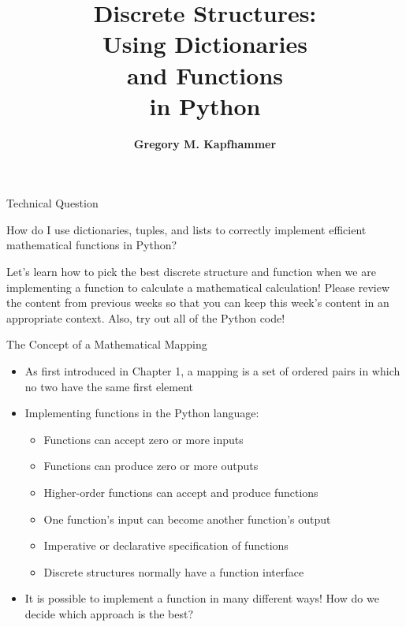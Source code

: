 \documentclass[14pt,aspectratio=169]{beamer}
\title{Discrete Structures: \\ Using Dictionaries \\ and Functions \\ in Python}
\author{{\bf Gregory M. Kapfhammer}}
\institute[shortinst]{{\bf Department of Computer Science, Allegheny College}}
\begin{document}
{
  \begin{frame}
    \titlepage
  \end{frame}
}

%
\begin{frame}{Technical Question}
  \hspace*{.5in}
  \begin{minipage}{4.3in}
    \vspace*{.1in}
    \begin{center}
      {\large How do I use dictionaries, tuples, and lists to correctly
      implement efficient mathematical functions in Python?}
    \end{center}
  \end{minipage}
  \vspace{2ex}
  \begin{center}
    \small Let's learn how to pick the best discrete structure and function when
    we are implementing a function to calculate a mathematical calculation!
    Please review the content from previous weeks so that you can keep this
    week's content in an appropriate context. Also, try out all of the Python
    code!
  \end{center}
\end{frame}

%
\begin{frame}{The Concept of a Mathematical Mapping}
  \begin{itemize}
    \item As first introduced in Chapter 1, a mapping is a set of ordered pairs
      in which no two have the same first element
      \vspace*{-.15in}
    \item Implementing functions in the Python language:
      \begin{itemize}
        \item Functions can accept zero or more inputs
        \item Functions can produce zero or more outputs
        \item Higher-order functions can accept and produce functions
        \item One function's input can become another function's output
        \item Imperative or declarative specification of functions
        \item Discrete structures normally have a function interface
      \end{itemize}
      \vspace*{-.2in}
    \item It is possible to implement a function in many different ways! How do
      we decide which approach is the best?
  \end{itemize}
\end{frame}
\end{document}
